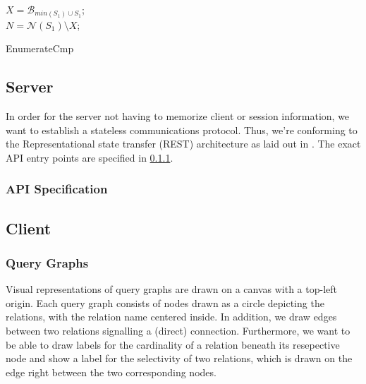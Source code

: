 \begin{algorithm}
    \BlankLine
    $X = \mathcal{B}_{min(S_1) \cup S_1}$;\\
    $N = \mathcal{N}(S_1)\setminus X$;\\
    \vspace{0.5cm}
    \caption{EnumerateCmp}    
\end{algorithm}

\subsection{Server}

In order for the server not having to memorize client or session information, we want to establish a stateless communications protocol.
Thus, we're conforming to the Representational state transfer (REST) architecture as laid out in \cite{fielding2000architectural}.
The exact API entry points are specified in \ref{sub:api-entry-points}.

\subsubsection{API Specification}
\label{sub:api-entry-points}

\subsection{Client}

\subsubsection{Query Graphs}
\label{subsub:query-graphs}

Visual representations of query graphs are drawn on a canvas with a top-left origin. Each query graph consists of nodes drawn as a circle depicting the relations, with the relation name centered inside. In addition, we draw edges  between two relations signalling a (direct) connection. Furthermore, we want to be able to draw labels for the cardinality of a relation beneath its resepective node and show a label for the selectivity of two relations, which is drawn on the edge right between the two corresponding nodes.

